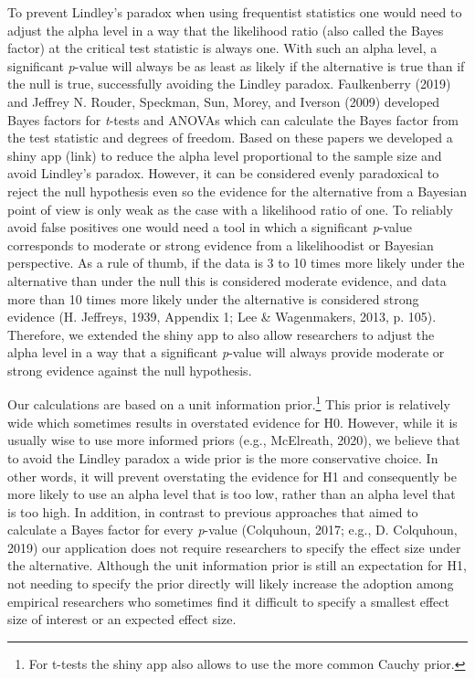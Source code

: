 \documentclass[
  english,
  ,man,floatsintext]{apa6}
\begin{document}
To prevent Lindley's paradox when using frequentist statistics one would need to adjust the alpha level in a way that the likelihood ratio (also called the Bayes factor) at the critical test statistic is always one. With such an alpha level, a significant \emph{p}-value will always be as least as likely if the alternative is true than if the null is true, successfully avoiding the Lindley paradox. Faulkenberry (2019) and Jeffrey N. Rouder, Speckman, Sun, Morey, and Iverson (2009) developed Bayes factors for \emph{t}-tests and ANOVAs which can calculate the Bayes factor from the test statistic and degrees of freedom.
Based on these papers we developed a shiny app (link) to reduce the alpha level proportional to the sample size and avoid Lindley's paradox. However, it can be considered evenly paradoxical to reject the null hypothesis even so the evidence for the alternative from a Bayesian point of view is only weak as the case with a likelihood ratio of one. To reliably avoid false positives one would need a tool in which a significant \emph{p}-value corresponds to moderate or strong evidence from a likelihoodist or Bayesian perspective. As a rule of thumb, if the data is 3 to 10 times more likely under the alternative than under the null this is considered moderate evidence, and data more than 10 times more likely under the alternative is considered strong evidence (H. Jeffreys, 1939, Appendix 1; Lee \& Wagenmakers, 2013, p. 105). Therefore, we extended the shiny app to also allow researchers to adjust the alpha level in a way that a significant \emph{p}-value will always provide moderate or strong evidence against the null hypothesis.

Our calculations are based on a unit information prior.\footnote{For t-tests the shiny app also allows to use the more common Cauchy prior.} This prior is relatively wide which sometimes results in overstated evidence for H0. However, while it is usually wise to use more informed priors (e.g., McElreath, 2020), we believe that to avoid the Lindley paradox a wide prior is the more conservative choice. In other words, it will prevent overstating the evidence for H1 and consequently be more likely to use an alpha level that is too low, rather than an alpha level that is too high. In addition, in contrast to previous approaches that aimed to calculate a Bayes factor for every \emph{p}-value (Colquhoun, 2017; e.g., D. Colquhoun, 2019) our application does not require researchers to specify the effect size under the alternative. Although the unit information prior is still an expectation for H1, not needing to specify the prior directly will likely increase the adoption among empirical researchers who sometimes find it difficult to specify a smallest effect size of interest or an expected effect size.
\end{document}
